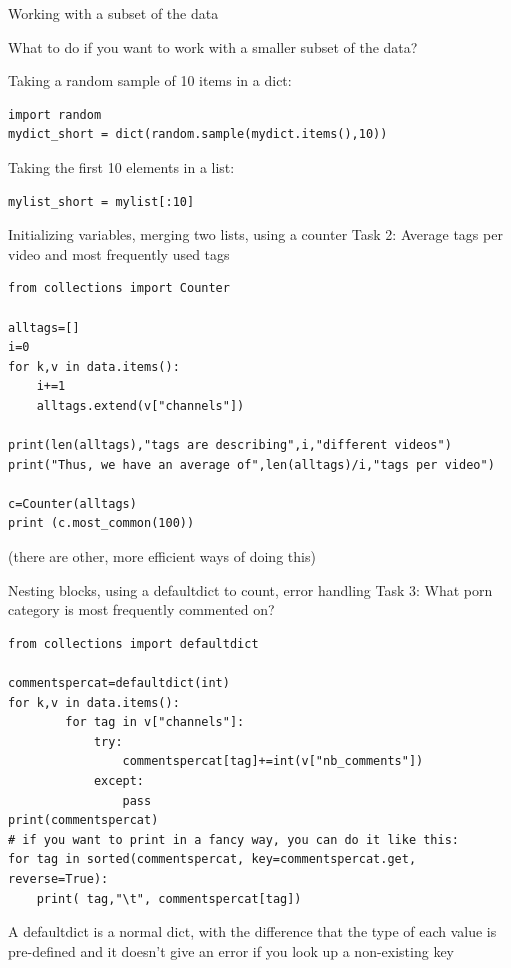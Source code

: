 \documentclass{beamer}
\begin{document}
\begin{frame}[fragile]{Working with a subset of the data}
	
What to do if you want to work with a smaller subset of the data?

Taking a random sample of 10 items in a dict:
	\begin{lstlisting}
import random
mydict_short = dict(random.sample(mydict.items(),10))
	\end{lstlisting}
	
Taking the first 10 elements in a list:
	\begin{lstlisting}
mylist_short = mylist[:10]
	\end{lstlisting}

\end{frame}




\begin{frame}[fragile]{Initializing variables, merging two lists, using a counter}
Task 2: Average tags per video and most frequently used tags
\begin{lstlisting}
from collections import Counter
    
alltags=[]
i=0
for k,v in data.items():
    i+=1
    alltags.extend(v["channels"])

print(len(alltags),"tags are describing",i,"different videos")
print("Thus, we have an average of",len(alltags)/i,"tags per video")

c=Counter(alltags)
print (c.most_common(100))
\end{lstlisting}
\scriptsize{(there are other, more efficient ways of doing this)}

\end{frame}





\begin{frame}[fragile]{Nesting blocks, using a defaultdict to count, error handling}
Task 3: What porn category is most frequently commented on?
\begin{lstlisting}
from collections import defaultdict

commentspercat=defaultdict(int)
for k,v in data.items():
        for tag in v["channels"]:
            try:
                commentspercat[tag]+=int(v["nb_comments"])
            except:
                pass
print(commentspercat)
# if you want to print in a fancy way, you can do it like this:
for tag in sorted(commentspercat, key=commentspercat.get, reverse=True):
    print( tag,"\t", commentspercat[tag])
\end{lstlisting}
\scriptsize{A defaultdict is a normal dict, with the difference that the type of each value is pre-defined and it doesn't give an error if you look up a non-existing key}

\end{frame}
\end{document}
